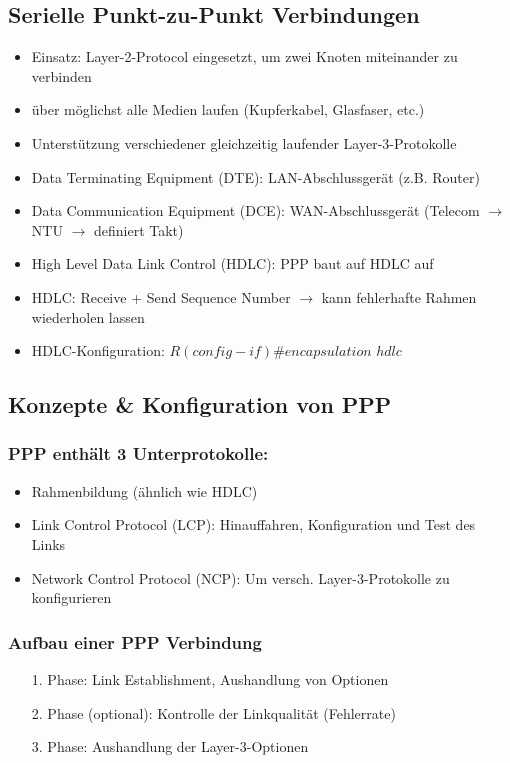 \documentclass[landscape,twocolumn,a4paper]{article}
\newcommand{\ra}{\rightarrow}
\begin{document}
\begin{footnotesize}
\subsection{Serielle Punkt-zu-Punkt Verbindungen}
\begin{itemize}
	\item Einsatz: Layer-2-Protocol eingesetzt, um zwei Knoten miteinander zu verbinden
	\item über möglichst alle Medien laufen (Kupferkabel, Glasfaser, etc.)
	\item Unterstützung verschiedener gleichzeitig laufender Layer-3-Protokolle
	\item Data Terminating Equipment (DTE): LAN-Abschlussgerät (z.B. Router)
	\item Data Communication Equipment (DCE): WAN-Abschlussgerät (Telecom $\ra$ NTU $\ra$ definiert Takt)
	\item High Level Data Link Control (HDLC): PPP baut auf HDLC auf
	\item HDLC: Receive + Send Sequence Number $\ra$ kann fehlerhafte Rahmen wiederholen lassen
	\item HDLC-Konfiguration: $R(config-if)\#encapsulation$ $hdlc$
\end{itemize}

\subsection{Konzepte \& Konfiguration von PPP}
\subsubsection{PPP enthält 3 Unterprotokolle:}
\begin{itemize}
	\item Rahmenbildung (ähnlich wie HDLC)
	\item Link Control Protocol (LCP): Hinauffahren, Konfiguration und Test des Links
	\item Network Control Protocol (NCP): Um versch. Layer-3-Protokolle zu konfigurieren
\end{itemize}

\subsubsection{Aufbau einer PPP Verbindung}
\begin{itemize}
	\item[1.] Phase: Link Establishment, Aushandlung von Optionen
	\item[2.] Phase (optional): Kontrolle der Linkqualität (Fehlerrate)
	\item[3.] Phase: Aushandlung der Layer-3-Optionen
\end{itemize}


\end{footnotesize}
\end{document}
